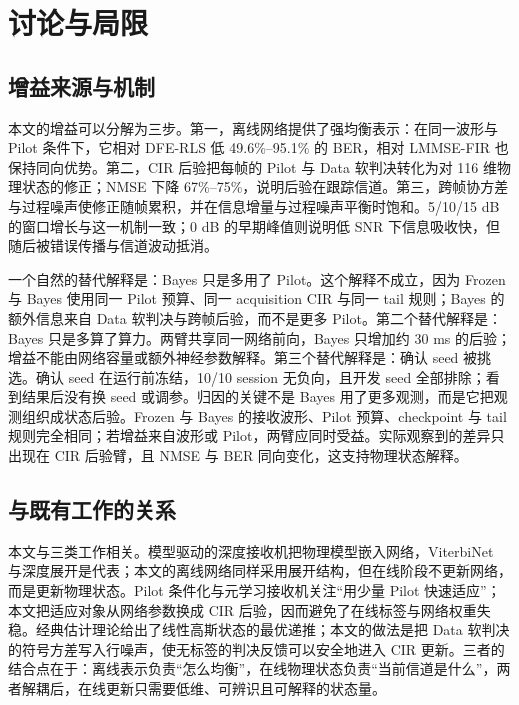 \section{讨论与局限}

\subsection{增益来源与机制}

本文的增益可以分解为三步。第一，离线网络提供了强均衡表示：在同一波形与 Pilot 条件下，它相对 DFE-RLS 低 49.6\%–95.1\% 的 BER，相对 LMMSE-FIR 也保持同向优势。第二，CIR 后验把每帧的 Pilot 与 Data 软判决转化为对 116 维物理状态的修正；NMSE 下降 67\%–75\%，说明后验在跟踪信道。第三，跨帧协方差与过程噪声使修正随帧累积，并在信息增量与过程噪声平衡时饱和。5/10/15 dB 的窗口增长与这一机制一致；0 dB 的早期峰值则说明低 SNR 下信息吸收快，但随后被错误传播与信道波动抵消。

一个自然的替代解释是：Bayes 只是多用了 Pilot。这个解释不成立，因为 Frozen 与 Bayes 使用同一 Pilot 预算、同一 acquisition CIR 与同一 tail 规则；Bayes 的额外信息来自 Data 软判决与跨帧后验，而不是更多 Pilot。第二个替代解释是：Bayes 只是多算了算力。两臂共享同一网络前向，Bayes 只增加约 30 ms 的后验；增益不能由网络容量或额外神经参数解释。第三个替代解释是：确认 seed 被挑选。确认 seed 在运行前冻结，10/10 session 无负向，且开发 seed 全部排除；看到结果后没有换 seed 或调参。归因的关键不是 Bayes 用了更多观测，而是它把观测组织成状态后验。Frozen 与 Bayes 的接收波形、Pilot 预算、checkpoint 与 tail 规则完全相同；若增益来自波形或 Pilot，两臂应同时受益。实际观察到的差异只出现在 CIR 后验臂，且 NMSE 与 BER 同向变化，这支持物理状态解释。

\subsection{与既有工作的关系}

本文与三类工作相关。模型驱动的深度接收机把物理模型嵌入网络，ViterbiNet 与深度展开是代表\cite{shlezinger2020,hershey2014}；本文的离线网络同样采用展开结构，但在线阶段不更新网络，而是更新物理状态。Pilot 条件化与元学习接收机关注“用少量 Pilot 快速适应”\cite{park2021,cohen2022}；本文把适应对象从网络参数换成 CIR 后验，因而避免了在线标签与网络权重失稳。经典估计理论给出了线性高斯状态的最优递推\cite{kay1993}；本文的做法是把 Data 软判决的符号方差写入行噪声，使无标签的判决反馈可以安全地进入 CIR 更新。三者的结合点在于：离线表示负责“怎么均衡”，在线物理状态负责“当前信道是什么”，两者解耦后，在线更新只需要低维、可辨识且可解释的状态量。

